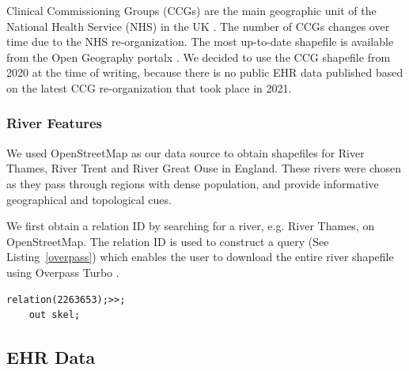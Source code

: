 Clinical Commissioning Groups (CCGs) are the main geographic unit of the National Health Service (NHS) in the UK \cite{nhsNHS}. The number of CCGs changes over time due to the NHS re-organization. The most up-to-date shapefile is available from the Open Geography portalx \cite{opengeographyportalxOpen}. We decided to use the CCG shapefile from 2020 at the time of writing, because there is no public EHR data published based on the latest CCG re-organization that took place in 2021.

\subsubsection{River Features}

We used OpenStreetMap \cite{openstreetmapRelation} as our data source to obtain shapefiles for River Thames, River Trent and River Great Ouse in England. These rivers were chosen as they pass through regions with dense population, and provide informative geographical and topological cues. 

We first obtain a relation ID by searching for a river, e.g. River Thames, on OpenStreetMap. The relation ID is used to construct a query (See Listing~\ref{overpass}) which enables the user to download the entire river shapefile using Overpass Turbo \cite{overpassturboOverpass}.

\begin{lstlisting}[caption={The query that downloads the shapefile of River Thames from OpenStreetMap via the Overpass Turbo API.}, label={overpass},captionpos=b]
    relation(2263653);>>;
    out skel;
\end{lstlisting}

\subsection{EHR Data}

